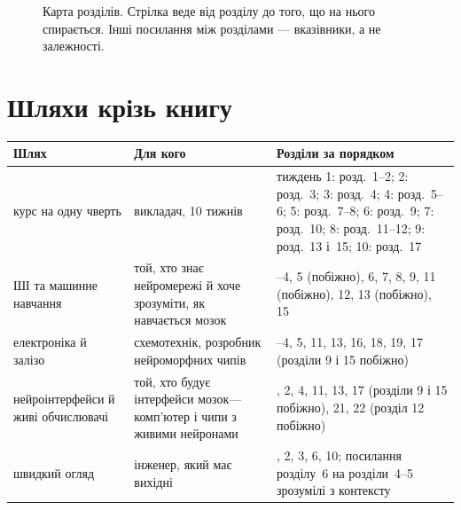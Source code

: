 \begin{figure}[h]
\caption{Карта розділів. Стрілка веде від розділу до того, що на нього спирається. Інші посилання між розділами --- вказівники, а не залежності.}
\label{fig:roadmap}
\end{figure}

\section*{Шляхи крізь книгу}

\begin{center}
\footnotesize
\setlength{\tabcolsep}{4pt}
\renewcommand{\arraystretch}{1.2}
\begin{tabular}{>{\raggedright}p{3.0cm}>{\raggedright}p{3.9cm}>{\raggedright\arraybackslash}p{6.4cm}}
\toprule
Шлях & Для кого & Розділи за порядком \\
\midrule
курс на одну чверть & викладач, 10 тижнів & тиждень 1: розд.~1--2; 2: розд.~3; 3: розд.~4; 4: розд.~5--6; 5: розд.~7--8; 6: розд.~9; 7: розд.~10; 8: розд.~11--12; 9: розд.~13 і~15; 10: розд.~17 \\
ШІ та машинне навчання & той, хто знає нейромережі й хоче зрозуміти, як навчається мозок & 1--4, 5 (побіжно), 6, 7, 8, 9, 11 (побіжно), 12, 13 (побіжно), 15 \\
електроніка й залізо & схемотехнік, розробник нейроморфних чипів & 1--4, 5, 11, 13, 16, 18, 19, 17 (розділи 9 і 15 побіжно) \\
нейроінтерфейси й живі обчислювачі & той, хто будує інтерфейси мозок---комп'ютер і чипи з живими нейронами & 1, 2, 4, 11, 13, 17 (розділи 9 і 15 побіжно), 21, 22 (розділ 12 побіжно) \\
швидкий огляд & інженер, який має вихідні & 1, 2, 3, 6, 10; посилання розділу~6 на розділи~4--5 зрозумілі з контексту \\
\bottomrule
\end{tabular}
\end{center}

